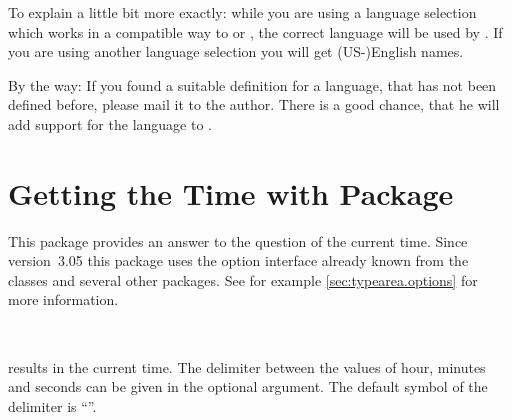 \begin{Explain}
  To explain a little bit more exactly: while you are using a language
  selection which works in a compatible way to
   or
  , the correct language will be used
  by . If you are using another language selection you will
  get (US-)English names.
\end{Explain}

By the way: If you found a suitable definition for a language, that has not
been defined before, please mail it to the \KOMAScript{} author. There is a
good chance, that he will add support for the language to .%
%
%


\chapter{Getting the Time with Package }

This package provides an answer to the question of the current time. Since
version~3.05 this package uses the option interface already known from
the \KOMAScript{} classes and several other \KOMAScript{} packages. See for
example \autoref{sec:typearea.options} for more information.

\begin{Declaration}%
  \\
\end{Declaration}%
%
 results in the current time. The
delimiter between the values of hour, minutes and seconds can be given
in the optional argument. The default symbol of the delimiter is
``\PValue{:}''.

